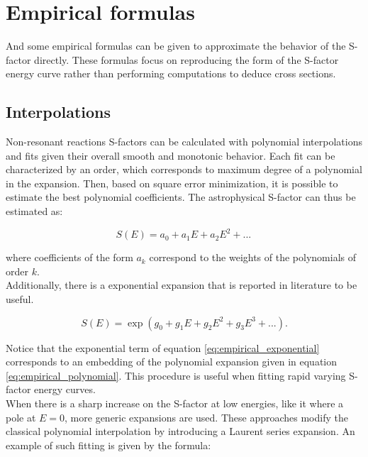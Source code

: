 \documentclass[openany]{book}
\begin{document}
\section{Empirical formulas} \label{sec:empiricalFormulas}

And some empirical formulas can be given to approximate the behavior of the S-factor directly. These formulas focus on reproducing the form of the S-factor energy curve rather than performing computations to deduce cross sections.

\subsection{Interpolations} \label{sub:empirical_interpolation}

Non-resonant reactions S-factors can be calculated with polynomial interpolations and fits given their overall smooth and monotonic behavior. Each fit can be characterized by an order, which corresponds to maximum degree of a polynomial in the expansion. Then, based on square error minimization, it is possible to estimate the best polynomial coefficients. The astrophysical S-factor can thus be estimated as:

\begin{equation}  \label{eq:empirical_polynomial}
	S(E) = a_0 + a_1E + a_2 E^2 + ... \, 
\end{equation}

where coefficients of the form $a_k$ correspond to the weights of the polynomials of order $k$. \\

Additionally,  there is a exponential expansion that is reported in literature to be useful. 

\begin{equation} \label{eq:empirical_exponential}
	S(E) = \exp{(g_0 + g_1E + g_2E^2 + g_3E^3 + ...)}.
\end{equation}

Notice that the exponential term of equation \ref{eq:empirical_exponential} corresponds to an embedding of the polynomial expansion given in equation \ref{eq:empirical_polynomial}. This procedure is useful when fitting rapid varying S-factor energy curves. \\

When there is a sharp increase on the S-factor at low energies, like it where a pole at $E = 0$,  more generic expansions are used. These approaches modify the classical polynomial interpolation by introducing a Laurent series expansion. An example of such fitting is given by the formula: 
\end{document}
